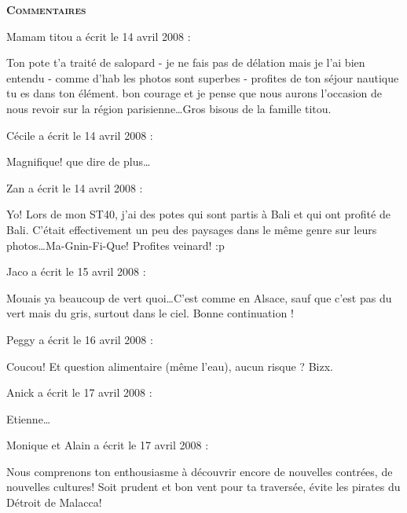 \bigskip
\textbf{\textsc{Commentaires}}

\medskip
Mamam titou a écrit le 14 avril 2008 :
\begin{displayquote}
Ton pote t'a traité de salopard - je ne fais pas de  délation mais je l'ai bien entendu - comme d'hab les photos sont superbes - profites de ton séjour nautique tu es dans ton élément. bon courage et je pense que nous aurons l'occasion de nous revoir sur la région parisienne\dots Gros bisous de la famille titou.
\end{displayquote}

\medskip
Cécile a écrit le 14 avril 2008 :
\begin{displayquote}
Magnifique! que dire de plus\dots
\end{displayquote}

\medskip
Zan a écrit le 14 avril 2008 :
\begin{displayquote}
Yo!
Lors de mon ST40, j'ai des potes qui sont partis à Bali et qui ont profité de Bali. C'était effectivement un peu des paysages dans le même genre sur leurs photos\dots Ma-Gnin-Fi-Que!
Profites veinard! :p
\end{displayquote}

\medskip
Jaco a écrit le 15 avril 2008 :
\begin{displayquote}
Mouais ya beaucoup de vert quoi\dots C'est comme en Alsace, sauf que c'est pas du vert mais du gris, surtout dans le ciel.
Bonne continuation !
\end{displayquote}

\medskip
Peggy a écrit le 16 avril 2008 :
\begin{displayquote}
Coucou!
Et question alimentaire (même l'eau), aucun risque ?
Bizx.
\end{displayquote}

\medskip
Anick a écrit le 17 avril 2008 :
\begin{displayquote}
Etienne\dots
\end{displayquote}

\medskip
Monique et Alain a écrit le 17 avril 2008 :
\begin{displayquote}
Nous comprenons ton enthousiasme à découvrir encore de nouvelles contrées, de nouvelles cultures! Soit prudent et bon vent pour ta traversée, évite les pirates du Détroit de Malacca!
\end{displayquote}

